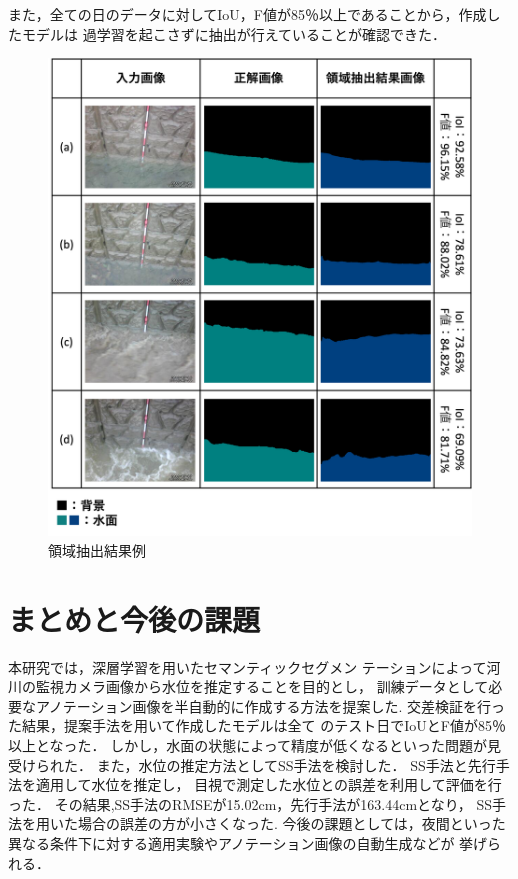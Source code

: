 \documentclass[a4j,twocolumn,10pt]{jarticle}
\begin{document}
また，全ての日のデータに対してIoU，F値が85％以上であることから，作成したモデルは
過学習を起こさずに抽出が行えていることが確認できた．





\begin{figure}[t] 
    \begin{center}
      \includegraphics[keepaspectratio,scale=0.355]{./figs/kousa_1.png}
    \end{center}
    \vspace{-8mm}
    \caption{領域抽出結果例}
    \vspace{-6mm}
    \label{images_kousa}
\end{figure}


\section{まとめと今後の課題}
\vspace{-1mm}

本研究では，深層学習を用いたセマンティックセグメン
テーションによって河川の監視カメラ画像から水位を推定することを目的とし，
訓練データとして必要なアノテーション画像を半自動的に作成する方法を提案した.
交差検証を行った結果，提案手法を用いて作成したモデルは全て
のテスト日でIoUとF値が85％以上となった．
しかし，水面の状態によって精度が低くなるといった問題が見受けられた．
また，水位の推定方法としてSS手法を検討した．
SS手法と先行手法を適用して水位を推定し，
目視で測定した水位との誤差を利用して評価を行った．
その結果,SS手法のRMSEが15.02cm，先行手法が163.44cmとなり，
SS手法を用いた場合の誤差の方が小さくなった.
今後の課題としては，夜間といった異なる条件下に対する適用実験やアノテーション画像の自動生成などが
挙げられる．
\end{document}
